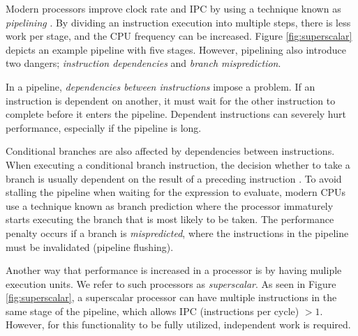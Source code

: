 Modern processors improve clock rate and IPC by using a technique known as \textit{pipelining} \cite{Boncz2005-wj}. By dividing an instruction execution into multiple steps, there is less work per stage, and the CPU frequency can be increased. Figure \ref{fig:superscalar} depicts an example pipeline with five stages. However, pipelining also introduce two dangers; \textit{instruction dependencies} and \textit{branch misprediction}.

In a pipeline, \textit{dependencies between instructions} impose a problem. If an instruction is dependent on another, it must wait for the other instruction to complete before it enters the pipeline. Dependent instructions can severely hurt performance, especially if the pipeline is long.

Conditional branches are also affected by dependencies between instructions. When executing a conditional branch instruction, the decision whether to take a branch is usually dependent on the result of a preceding instruction \cite{Boncz2005-wj}. To avoid stalling the pipeline when waiting for the expression to evaluate, modern CPUs use a technique known as branch prediction where the processor immaturely starts executing the branch that is most likely to be taken. The performance penalty occurs if a branch is \textit{mispredicted}, where the instructions in the pipeline must be invalidated (pipeline flushing).

Another way that performance is increased in a processor is by having muliple execution units. We refer to such processors as \textit{superscalar}. As seen in Figure \ref{fig:superscalar}, a superscalar processor can have multiple instructions in the same stage of the pipeline, which allows IPC (instructions per cycle) $> 1$. However, for this functionality to be fully utilized, independent work is required.


